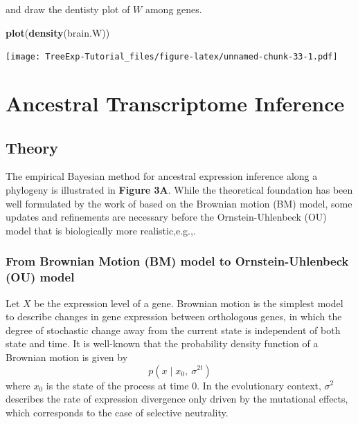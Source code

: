 \documentclass[]{book}
\newenvironment{Shaded}{\begin{snugshade}}{\end{snugshade}}
\newcommand{\KeywordTok}[1]{\textcolor[rgb]{0.13,0.29,0.53}{\textbf{#1}}}
\newcommand{\NormalTok}[1]{#1}
\begin{document}
and draw the dentisty plot of \(W\) among genes.

\begin{Shaded}
\begin{Highlighting}[]
\KeywordTok{plot}\NormalTok{(}\KeywordTok{density}\NormalTok{(brain.W))}
\end{Highlighting}
\end{Shaded}

\texttt{[image: TreeExp-Tutorial\_files/figure-latex/unnamed-chunk-33-1.pdf]}

\hypertarget{ancestral-transcriptome-inference}{%
\chapter{Ancestral Transcriptome Inference}\label{ancestral-transcriptome-inference}}

\hypertarget{theory-3}{%
\section{Theory}\label{theory-3}}

The empirical Bayesian method for ancestral expression inference along a phylogeny is illustrated in \textbf{Figure 3A}. While the theoretical foundation has been well formulated by the work of \citep{gu2004} based on the Brownian motion (BM) model, some updates and refinements are necessary before the Ornstein-Uhlenbeck (OU) model that is biologically more realistic,e.g.,\citep{bedford2009}.

\hypertarget{from-brownian-motion-bm-model-to-ornstein-uhlenbeck-ou-model}{%
\subsection{From Brownian Motion (BM) model to Ornstein-Uhlenbeck (OU) model}\label{from-brownian-motion-bm-model-to-ornstein-uhlenbeck-ou-model}}

Let \(X\) be the expression level of a gene. Brownian motion is the simplest model to describe changes in gene expression between orthologous genes, in which the degree of stochastic change away from the current state is independent of both state and time. It is well-known that the probability density function of a Brownian motion is given by
\[p\left(x\mid x_0,\  \sigma^{2t}\right)\tag{4.1}\]
where \(x_0\) is the state of the process at time 0. In the evolutionary context, \(\sigma^{2}\) describes the rate of expression divergence only driven by the mutational effects, which corresponds to the case of selective neutrality.
\end{document}
